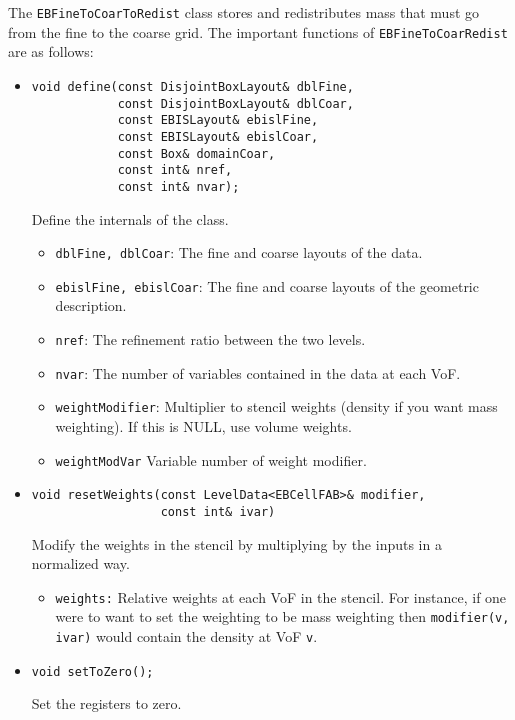 The {\tt EBFineToCoarToRedist} class stores and redistributes mass
that must go from the fine to the coarse grid.
The important functions of {\tt EBFineToCoarRedist} are as follows:
\begin{itemize}
\item \begin{small}\begin{verbatim}
void define(const DisjointBoxLayout& dblFine,
            const DisjointBoxLayout& dblCoar,
            const EBISLayout& ebislFine,
            const EBISLayout& ebislCoar,
            const Box& domainCoar,
            const int& nref,
            const int& nvar);
\end{verbatim}\end{small}
Define the internals of the class. 
\begin{itemize}
\item {\tt dblFine, dblCoar}: The fine and coarse layouts
        of the data.
\item {\tt ebislFine, ebislCoar}: The fine and coarse layouts
        of the geometric description.
\item {\tt nref}: The refinement ratio between the two levels.
\item {\tt nvar}: The number of variables contained in the data
        at each VoF.
\item {\tt weightModifier}: Multiplier to stencil weights (density
        if you want mass weighting).  If this is NULL, use
        volume weights.
\item {\tt weightModVar} Variable number of weight modifier.
\end{itemize}


\item \begin{small}\begin{verbatim}
void resetWeights(const LevelData<EBCellFAB>& modifier,
                  const int& ivar)
\end{verbatim}\end{small}
Modify the weights in the stencil by multiplying by
the inputs in a normalized way.
\begin{itemize}
\item {\tt weights:}  Relative weights at each VoF in the
stencil.  For instance, if one were to want to set the 
weighting to be mass weighting then {\tt modifier(v, ivar)}
would contain the density at VoF {\tt v}.
\end{itemize}

\item \begin{small}\begin{verbatim}
void setToZero();
\end{verbatim}\end{small}
Set the registers to zero.


\end{itemize}
